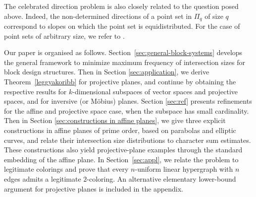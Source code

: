 \documentclass[10pt]{article}
\newcommand{\PG}{\mathrm{PG}}
\theoremstyle{definition}
\newcommand{\zsst}[1]{%
	\bgroup
	\markoverwith{\textcolor{magenta}{\rule[0.5ex]{2pt}{1.2pt}}}%
	\ULon{#1}%
	\egroup
}
\begin{document}
	
	The celebrated direction problem \cite{Ball03, BBB99} is also closely related to the question posed above. Indeed, 
	the non-determined directions of a point set in $\Pi_q$ of size $q$ correspond to slopes on which the point set is equidistributed. For the case of point sets of {arbitrary} size, we refer to
	\cite{Ghidelli, KS24}.

	{Our paper is organised as follows. Section~\ref{sec:general-block-systems} develops the general  framework to minimize maximum frequency of intersection sizes for block design structures. Then in Section \ref{sec:application}, we  derive Theorem~\ref{leggyakoribb} for projective planes, and continue by obtaining the respective results for $k$-dimensional subspaces of vector spaces and projective spaces, and for inversive (or Möbius) planes.  Section \ref{sec:ref} presents refinements for the affine and projective space case, when the subspace has small cardinality. Then in Section \ref{sec:constructions in affine planes}, we give three explicit constructions in affine planes of prime
		order, based on parabolas and elliptic curves, and relate their
		intersection size distributions to character sum estimates. These
		constructions also yield projective-plane examples through the standard
		embedding of the affine plane. In Section~\ref{sec:appl}, we relate the
		problem to legitimate colorings and prove that every \(n\)-uniform linear
		hypergraph with \(n\) edges admits a legitimate \(2\)-coloring. An alternative elementary lower-bound argument for projective planes is included in the appendix.}
	
\end{document}
